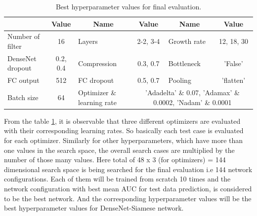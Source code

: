\begin{table}[ht]
\centering
\caption{Best hyperparameter values for final evaluation.}
\resizebox{\textwidth}{!}
{\begin{tabular}{|l c| l c| l c|} 
 \hline\hline
 \rowcolor{lightgrey}
 \multicolumn{1}{|c}{\textbf{Name}} & \multicolumn{1}{c|}{\textbf{Value}} & \multicolumn{1}{c}{\textbf{Name}} & \multicolumn{1}{c|}{\textbf{Value}} & \multicolumn{1}{c}{\textbf{Name}} & \multicolumn{1}{c|}{\textbf{Value}} \\ [0.5ex] 
 \hline
 Number of filter & 16 & Layers & 2-2, 3-4 & Growth rate & 12, 18, 30\\
 \hline
 DenseNet dropout & 0.2, 0.4 & Compression & 0.3, 0.7 & Bottleneck & 'False'\\
 \hline
 FC output & 512 & FC dropout & 0.5, 0.7 & Pooling & 'flatten' \\
 \hline
 Batch size & 64 & Optimizer \& learning rate & \multicolumn{3}{c|}{'Adadelta' \& 0.07, 'Adamax' \& 0.0002, 'Nadam' \& 0.0001} \\
 \hline \hline
\end{tabular}}
\label{table:final_run_search_space}
\end{table}

From the table \ref{table:final_run_search_space}, it is observable that three different optimizers are evaluated with their corresponding learning rates. So basically each test case is evaluated for each optimizer.
Similarly for other hyperparameters, which have more than one values in the search space, the overall search cases are multiplied by the number of those many values. Here total of 48 x 3 (for optimizers) = 144 dimensional search space is 
being searched for the final evaluation i.e 144 network configurations. Each of them will be trained from scratch 10 times and the network configuration with best mean AUC for test data prediction, is considered to be the best network. 
And the corresponding hyperparameter values will be the best hyperparameter values for DenseNet-Siamese network.


